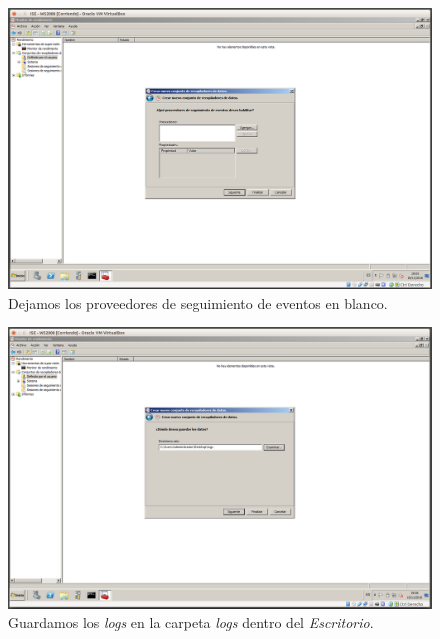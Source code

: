 \documentclass[a4paper,titlepage,12pt]{scrartcl}	%
\numberwithin{figure}{section} %
\numberwithin{table}{section} %
\begin{document}
	\begin{figure}[H]
		\centering
		\includegraphics[scale=0.27]{./Imagenes/5-7.png}
		\caption[Dejamos los proveedores de seguimiento de eventos en blanco.]{Dejamos los proveedores de seguimiento de eventos en blanco.}
		\label{5-7}
	\end{figure}
	
	\begin{figure}[H]
		\centering
		\includegraphics[scale=0.27]{./Imagenes/5-8.png}
		\caption[Guardamos los \textit{logs} en la carpeta \textit{logs} dentro del \textit{Escritorio}.]{Guardamos los \textit{logs} en la carpeta \textit{logs} dentro del \textit{Escritorio}.}
		\label{5-8}
	\end{figure}
	
\end{document}
